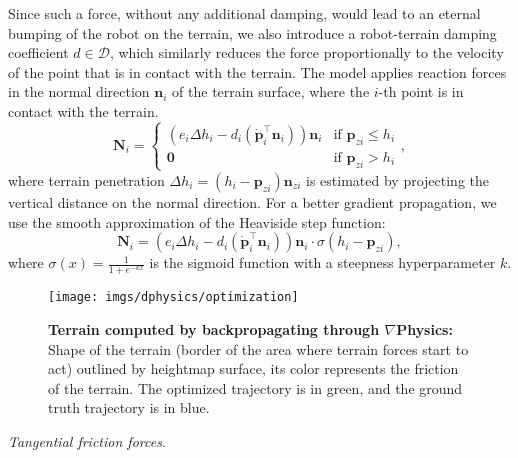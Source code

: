 Since such a force, without any additional damping, would lead to an eternal bumping
of the robot on the terrain, we also introduce a robot-terrain damping coefficient $d\in\mathcal{D}$,
which similarly reduces the force proportionally to the velocity of the point
that is in contact with the terrain.
The model applies reaction forces in the normal direction $\mathbf{n}_i$ of the terrain surface,
where the $i$-th point is in contact with the terrain.
\begin{equation}\label{eq:normal_force}
    \mathbf{N}_{i} = \begin{cases}
 (e_i\Delta h_i - d_i(\dot{\mathbf{p}}_{i}^\top\mathbf{n}_i))\mathbf{n}_i  & \text{if } \mathbf{p}_{zi}\leq h_i \\
\mathbf{0} & \text{if } \mathbf{p}_{zi}> h_i
\end{cases},
\end{equation}
where terrain penetration $\Delta h_i = (h_i-\mathbf{p}_{zi})\mathbf{n}_{zi}$ is
estimated by projecting the vertical distance on the normal direction.
For a better gradient propagation, we use the smooth approximation of the Heaviside step function:
\begin{equation}
    \label{eq:smooth_normal_force}
    \mathbf{N}_i = (e_i\Delta h_i - d_i(\dot{\mathbf{p}}_{i}^\top\mathbf{n}_i))\mathbf{n}_i \cdot \sigma(h_i - \mathbf{p}_{zi}),
\end{equation}
where $\sigma(x) = \frac{1}{1+e^{-kx}}$ is the sigmoid function with a steepness hyperparameter $k$.

\begin{figure}[t]
    \centering
    \texttt{[image: imgs/dphysics/optimization]}
    \caption{\textbf{Terrain computed by backpropagating through $\nabla$Physics:}
    Shape of the terrain (border of the area where terrain forces start to act) outlined by heightmap surface,
    its color represents the friction of the terrain.
    The optimized trajectory is in green, and the ground truth trajectory is in blue.}
    \label{fig:terrain_optim}
\end{figure}

\textit{Tangential friction forces}.

